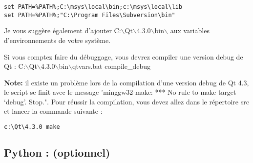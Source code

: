 \begin{verbatim}
set PATH=%PATH%;C:\msys\local\bin;c:\msys\local\lib 
set PATH=%PATH%;"C:\Program Files\Subversion\bin" 
\end{verbatim}

Je vous suggère également d'ajouter
C:$\backslash$Qt$\backslash$4.3.0$\backslash$bin$\backslash$ aux variables
d'environnements de votre système.

Si vous comptez faire du débuggage, vous devrez compiler une version debug de Qt
:
C:$\backslash$Qt$\backslash$4.3.0$\backslash$bin$\backslash$qtvars.bat
compile\_debug

\textbf{Note:} il existe un problème lors de la compilation d'une version debug
de Qt 4.3, le script se finit avec le message 'minggw32-make: *** No rule to make target `debug'. Stop.".
Pour réussir la compilation, vous devez allez dans le répertoire src et lancer la commande suivante :

\begin{verbatim}
c:\Qt\4.3.0 make 
\end{verbatim}


 \subsection{Python : (optionnel)}

%
%
%


